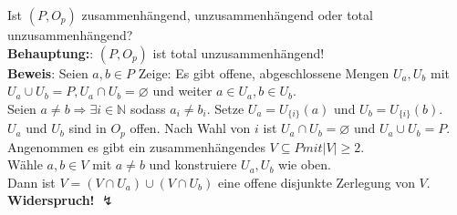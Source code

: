 \begin{problem}[2b]
  Ist \( (P, O_p) \) zusammenhängend, unzusammenhängend oder total unzusammenhängend? \\
  \textbf{Behauptung:}: \( (P, O_p) \) ist total unzusammenhängend! \\
  \textbf{Beweis}: Seien \( a,b \in P \) Zeige: Es gibt offene, abgeschlossene Mengen \( U_a, U_b \) mit \( U_a \cup U_b = P, U_a \cap U_b = \varnothing \) und weiter \( a \in U_a , b \in U_b \). \\
  Seien \( a \neq b \Rightarrow \exists i \in \mathbb{N} \) sodass \( a_i \neq b_i \). Setze \( U_a = U_{\{ i \}}(a) \) und \( U_b = U_{\{ i \}}(b) \). \\
  \( U_a \) und \( U_b \) sind in \( O_p \) offen. Nach Wahl von \( i \) ist \( U_a \cap U_b = \varnothing \) und \( U_a \cup U_b = P \). Angenommen es gibt ein zusammenhängendes \( V \subseteq P mit \vert V \vert \geq 2 \). \\
  Wähle \( a, b \in V \) mit \( a \neq b \) und konstruiere \( U_a, U_b \) wie oben. \\
  Dann ist \( V = (V \cap U_a) \cup (V \cap U_b) \) eine offene disjunkte Zerlegung von \( V \). \\
  \textbf{Widerspruch!} \( \lightning \)
  
\end{problem}

